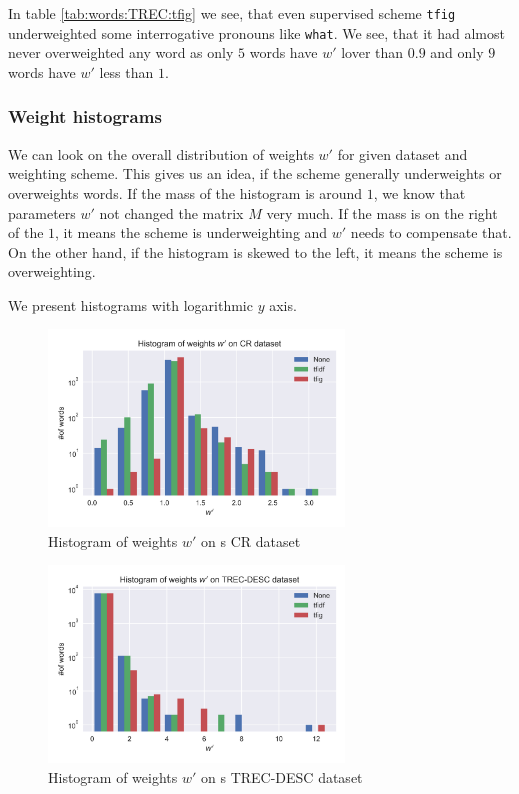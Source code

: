     In table \ref{tab:words:TREC:tfig} we see, that even supervised scheme \texttt{tfig} underweighted some interrogative pronouns like \texttt{what}.
    We see, that it had almost never overweighted any word as only $5$ words have $w'$ lover than $0.9$ and only $9$ words have $w'$ less than $1$.

    \subsubsection{Weight histograms}
    
    We can look on the overall distribution of weights $w'$ for given dataset and weighting scheme.
    This gives us an idea, if the scheme generally underweights or overweights words.
    If the mass of the histogram is around $1$, we know that parameters $w'$ not changed the matrix $M$ very much.
    If the mass is on the right of the $1$, it means the scheme is underweighting and $w'$ needs to compensate that. On the other hand, if the histogram is skewed to the left, it means the scheme is overweighting.
    
    We present histograms with logarithmic $y$ axis.
    
    \begin{figure}
    \centerline{\includegraphics[width=0.7\textwidth]{images/histw_cr.png}}
    \caption[Histogram of weights $w'$ on s CR dataset]{Histogram of weights $w'$ on s CR dataset}
    \label{obr:hist:cr}
    \end{figure}

    \begin{figure}
    \centerline{\includegraphics[width=0.7\textwidth]{images/histw_desc.png}}
    \caption[Histogram of weights $w'$ on s TREC-DESC dataset]{Histogram of weights $w'$ on s TREC-DESC dataset}
    \label{obr:hist:desc}
    \end{figure}


